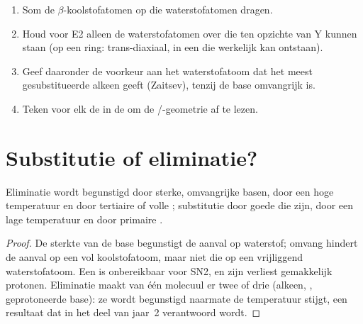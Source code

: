 \begin{method}\label{met:b1:elimination:predict-alkene}
\begin{enumerate}
  \item Som de $\beta$-koolstofatomen op die waterstofatomen dragen.
  \item Houd voor E2 alleen de waterstofatomen over die 
        ten opzichte van Y kunnen staan (op een ring: trans-diaxiaal, in
        een  die werkelijk kan ontstaan).
  \item Geef daaronder de voorkeur aan het waterstofatoom dat het meest
        gesubstitueerde alkeen geeft (Zaitsev), tenzij de base omvangrijk
        is.
  \item Teken voor elk de  in de  om de
        /-geometrie af te lezen.
\end{enumerate}
\end{method}

\section{Substitutie of eliminatie?}

\begin{proposition}\label{prop:b1:elimination:sn-vs-e}
Eliminatie wordt begunstigd door sterke, omvangrijke basen, door een hoge
temperatuur en door tertiaire of volle ; substitutie door
goede  die  zijn, door een lage temperatuur en
door primaire .
\end{proposition}

\begin{proof}
De sterkte van de base begunstigt de aanval op waterstof; omvang hindert
de aanval op een vol koolstofatoom, maar niet die op een vrijliggend
waterstofatoom. Een  is onbereikbaar voor SN2, en
zijn  verliest gemakkelijk protonen. Eliminatie maakt van één
molecuul er twee of drie (alkeen, , geprotoneerde
base): ze wordt begunstigd naarmate de temperatuur stijgt, een resultaat
dat in het deel van jaar~2 verantwoord wordt.
\end{proof}

